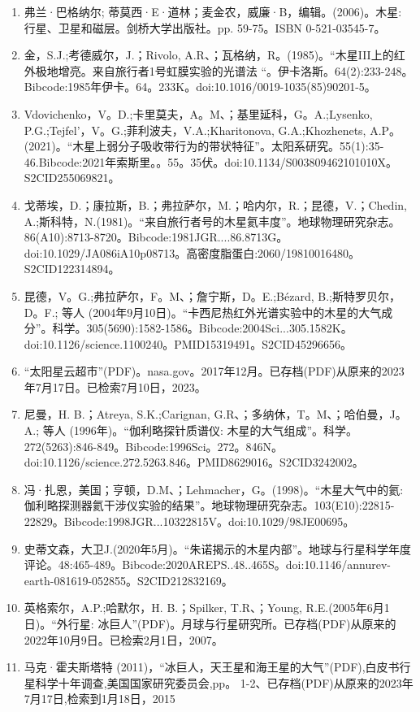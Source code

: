 \begin{enumerate}
\item 弗兰·巴格纳尔; 蒂莫西·E·道林；麦金农，威廉·B，编辑。(2006)。木星: 行星、卫星和磁层。剑桥大学出版社。pp. 59-75。ISBN 0-521-03545-7。
\item 金，S.J.;考德威尔，J.；Rivolo, A.R、；瓦格纳，R。(1985)。“木星III上的红外极地增亮。来自旅行者1号虹膜实验的光谱法 “。伊卡洛斯。64(2):233-248。Bibcode:1985年伊卡。64。233K。doi:10.1016/0019-1035(85)90201-5。
\item Vdovichenko，V。D.;卡里莫夫，A。M、；基里延科，G。A.;Lysenko, P.G.;Tejfel'，V。G.;菲利波夫，V.A.;Kharitonova, G.A.;Khozhenets, A.P。(2021)。“木星上弱分子吸收带行为的带状特征”。太阳系研究。55(1):35-46.Bibcode:2021年索斯里。。55。35伏。doi:10.1134/S003809462101010X。S2CID255069821。 
\item 戈蒂埃，D.；康拉斯，B.；弗拉萨尔，M.；哈内尔，R.；昆德，V.；Chedin, A.;斯科特，N.(1981)。“来自旅行者号的木星氦丰度”。地球物理研究杂志。86(A10):8713-8720。Bibcode:1981JGR....86.8713G。doi:10.1029/JA086iA10p08713。高密度脂蛋白:2060/19810016480。S2CID122314894。 
\item 昆德，V。G.;弗拉萨尔，F。M、；詹宁斯，D。E.;Bézard, B.;斯特罗贝尔，D。F.; 等人 (2004年9月10日)。“卡西尼热红外光谱实验中的木星的大气成分”。科学。305(5690):1582-1586。Bibcode:2004Sci...305.1582K。doi:10.1126/science.1100240。PMID15319491。S2CID45296656。  
\item “太阳星云超市”(PDF)。nasa.gov。2017年12月。已存档(PDF)从原来的2023年7月17日。已检索7月10日，2023。
\item 尼曼，H. B.；Atreya, S.K.;Carignan, G.R、；多纳休，T。M、；哈伯曼，J。A.; 等人 (1996年)。“伽利略探针质谱仪: 木星的大气组成”。科学。272(5263):846-849。Bibcode:1996Sci。272。846N。doi:10.1126/science.272.5263.846。PMID8629016。S2CID3242002。  
\item 冯·扎恩，美国；亨顿，D.M、；Lehmacher，G。(1998)。“木星大气中的氦: 伽利略探测器氦干涉仪实验的结果”。地球物理研究杂志。103(E10):22815-22829。Bibcode:1998JGR...10322815V。doi:10.1029/98JE00695。
\item 史蒂文森，大卫J.(2020年5月)。“朱诺揭示的木星内部”。地球与行星科学年度评论。48:465-489。Bibcode:2020AREPS..48..465S。doi:10.1146/annurev-earth-081619-052855。S2CID212832169。 
\item 英格索尔，A.P.;哈默尔，H. B.；Spilker, T.R、；Young, R.E.(2005年6月1日)。“外行星: 冰巨人”(PDF)。月球与行星研究所。已存档(PDF)从原来的2022年10月9日。已检索2月1日，2007。
\item 马克·霍夫斯塔特 (2011)，“冰巨人，天王星和海王星的大气”(PDF),白皮书行星科学十年调查,美国国家研究委员会,pp。 1-2、已存档(PDF)从原来的2023年7月17日,检索到1月18日，2015

\end{enumerate}
